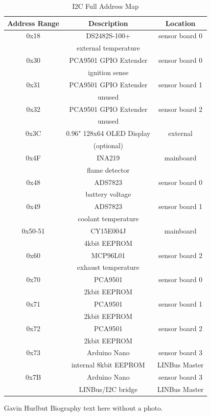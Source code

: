 \documentclass[lettersize,journal]{IEEEtran}
\begin{document}
\begin{table}
\begin{center}
\caption{I2C Full Address Map}
\label{i2c-full}
\begin{tabular}{| c | c | c |}
\hline
Address Range & Description & Location \\
\hline
0x18 & DS2482S-100+ & sensor board 0 \\
& external temperature & \\
\hline
0x30 & PCA9501 GPIO Extender & sensor board 0 \\
& ignition sense & \\
\hline
0x31 & PCA9501 GPIO Extender & sensor board 1 \\
& unused & \\
\hline
0x32 & PCA9501 GPIO Extender & sensor board 2 \\
& unused & \\
\hline
0x3C & 0.96" 128x64 OLED Display & external \\
& (optional) & \\
\hline
0x4F & INA219 & mainboard \\
& flame detector & \\
\hline
0x48 & ADS7823 & sensor board 0 \\
& battery voltage & \\
\hline
0x49 & ADS7823 & sensor board 1 \\
& coolant temperature & \\
\hline
0x50-51 & CY15E004J & mainboard \\
& 4kbit EEPROM & \\
\hline
0x60 & MCP96L01 & sensor board 2 \\
&  exhaust temperature & \\
\hline
0x70 & PCA9501 & sensor board 0 \\
& 2kbit EEPROM & \\
\hline
0x71 & PCA9501 & sensor board 1 \\
& 2kbit EEPROM & \\
\hline
0x72 & PCA9501 & sensor board 2 \\
& 2kbit EEPROM & \\
\hline
0x73 & Arduino Nano & sensor board 3 \\
& internal 8kbit EEPROM & LINBus Master \\
\hline
0x7B & Arduino Nano & sensor board 3 \\
& LINBus/I2C bridge & LINBus Master \\
\hline
\end{tabular}
\end{center}
\end{table}



\begin{IEEEbiographynophoto}{Gavin Hurlbut}
Biography text here without a photo.
\end{IEEEbiographynophoto}
\end{document}
